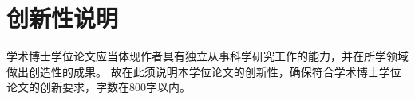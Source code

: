
\chapter*{创新性说明}

学术博士学位论文应当体现作者具有独立从事科学研究工作的能力，并在所学领域做出创造性的成果。
故在此须说明本学位论文的创新性，确保符合学术博士学位论文的创新要求，字数在800字以内。




